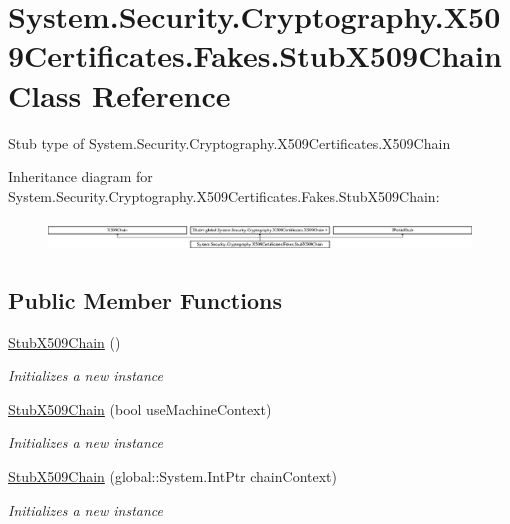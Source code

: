 \hypertarget{class_system_1_1_security_1_1_cryptography_1_1_x509_certificates_1_1_fakes_1_1_stub_x509_chain}{\section{System.\-Security.\-Cryptography.\-X509\-Certificates.\-Fakes.\-Stub\-X509\-Chain Class Reference}
\label{class_system_1_1_security_1_1_cryptography_1_1_x509_certificates_1_1_fakes_1_1_stub_x509_chain}
}


Stub type of System.\-Security.\-Cryptography.\-X509\-Certificates.\-X509\-Chain 


Inheritance diagram for System.\-Security.\-Cryptography.\-X509\-Certificates.\-Fakes.\-Stub\-X509\-Chain\-:\begin{figure}[H]
\begin{center}
\leavevmode
\includegraphics[height=0.833333cm]{class_system_1_1_security_1_1_cryptography_1_1_x509_certificates_1_1_fakes_1_1_stub_x509_chain}
\end{center}
\end{figure}
\subsection*{Public Member Functions}
\begin{DoxyCompactItemize}
\item 
\hyperlink{class_system_1_1_security_1_1_cryptography_1_1_x509_certificates_1_1_fakes_1_1_stub_x509_chain_adffe2c6c894ad2ec59a4e93e40bce098}{Stub\-X509\-Chain} ()
\begin{DoxyCompactList}\small\item\em Initializes a new instance\end{DoxyCompactList}\item 
\hyperlink{class_system_1_1_security_1_1_cryptography_1_1_x509_certificates_1_1_fakes_1_1_stub_x509_chain_afd6375d35c9798568ebec96c82575582}{Stub\-X509\-Chain} (bool use\-Machine\-Context)
\begin{DoxyCompactList}\small\item\em Initializes a new instance\end{DoxyCompactList}\item 
\hyperlink{class_system_1_1_security_1_1_cryptography_1_1_x509_certificates_1_1_fakes_1_1_stub_x509_chain_a78d92bc000806feb0c9a43c04778e110}{Stub\-X509\-Chain} (global\-::\-System.\-Int\-Ptr chain\-Context)
\begin{DoxyCompactList}\small\item\em Initializes a new instance\end{DoxyCompactList}\end{DoxyCompactItemize}
